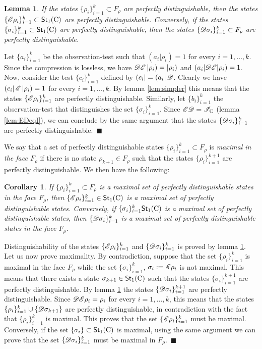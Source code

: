 \documentclass[12pt,aps,pra,showpacs,groupedaddress]{revtex4-1}
\newtheorem{lemma}{Lemma} \newtheorem{proposition}{Proposition}
\newtheorem{corollary}{Corollary} \newtheorem{theorem}{Theorem}
\def\Proof{\medskip\par\noindent{\bf Proof. }}
\def\qed{$\,\blacksquare$\par}
\def\rC{{\rm C}}
\def\Stset{{\mathsf{St}}}
\def\K#1{\left|#1\right)}  \def\B#1{\left(#1\right|}
\begin{document}
\begin{lemma}
  If the states $\{\rho_i\}_{i=1}^k\subset F_\rho$ are perfectly distinguishable, then the states
  $\{\tE\rho_i\}_{i=1}^k\subset\Stset_1(\rC)$ are perfectly distinguishable.  Conversely, if the
  states $\{\sigma_i\}_{i=1}^k\subset\Stset_1(\rC)$ are perfectly distinguishable, then the
  states $\{\mathscr D\sigma_i\}_{i=1}^k\subset F_\rho$ are perfectly distinguishable.
  \label{lem:distienc}
\end{lemma}

\Proof Let $\{a_i\}_{i=1}^k$ be the observation-test such that $(a_i|\rho_i)=1$ for every $i=1,
\dots, k$.  Since the compression is lossless, we have $\tD\tE\K{\rho_i}=\K{\rho_i}$ and
$(a_i|\mathscr D\mathscr E|\rho_i)=1$.  Now, consider the test $\{ c_i\}_{i=1}^k$ defined by $\B {c_i} = \B{a_i}
\tD$.  Clearly we have $\B {c_i} \tE \K{\rho_i} = 1$ for every $i=1, \dots, k$.  By lemma
\ref{lem:simpler} this means that the states $\{\mathscr E\rho_i\}_{i=1}^k$ are perfectly distinguishable.
Similarly, let $\{b_i\}_{i=1}^k$ the observation-test that distinguishes the set $\{\sigma_i\}_{i=1}^k$. Since
$\tE\tD=\tI_\rC$ (lemma \ref{lem:EDeqI}), we can conclude by the same argument that the states
$\{\mathscr D \sigma_i\}_{i=1}^k$ are perfectly distinguishable. \qed


We say that a set of perfectly distinguishable states $\{\rho_i\}_{i=1}^k \subset F_\rho$ is
\emph{maximal in the face $F_\rho$} if there is no state $\rho_{k+1}\in F_\rho$ such that the states
$\{\rho_i\}_{i=1}^{k+1}$ are perfectly distinguishable.  We then have the following:
  \begin{corollary}
    If $\{\rho_i\}_{i=1}^k \subset F_\rho$ is a maximal set of perfectly distinguishable states in
    the face $F_\rho$, then $\{\tE\rho_i\}_{i=1}^k\in\Stset_1 (\rC)$ is a maximal set of perfectly
    distinguishable states. Conversely, if $\{\sigma_i\}_{i=1}^k \Stset_1 (\rC)$ is a maximal set of
    perfectly distinguishable states, then $\{\mathscr D\sigma_i\}_{i=1}^k$ is a maximal set of perfectly
    distinguishable states in the face $F_\rho$.
  \label{cor:maxienc}
\end{corollary}
\Proof Distinguishability of the states $\{\mathscr E \rho_i\}_{i=1}^k$ and $\{\mathscr D\sigma_i\}_{i=1}^k$ is
proved by lemma \ref{lem:distienc}.  Let us now prove maximality.  By contradiction, suppose that the set $\{\rho_i\}_{i=1}^k$ is maximal in the face $F_\rho$ while the set $\{\sigma_i\}_{i=1}^k$, $\sigma_i: =\mathscr E \rho_i$ is not maximal.  This means that there exists a  state $\sigma_{k+1} \in\Stset_1 (\rC)$ such that the states $\{\sigma_i\}_{i=1}^{k+1}$ are perfectly distinguishable.   By lemma \ref{lem:distienc} the states  $\{\mathscr D  \sigma_i\}_{i=1}^{k+1}$ are perfectly distinguishable. Since $\mathscr D \mathscr E  \rho_i  =  \rho_i$ for every $i=1, \dots, k$, this means that the states $\{\rho_i\}_{i=1}^k \cup  \{ \mathscr D \sigma_{k+1} \}$ are perfectly distinguishable, in contradiction with the fact that $\{\rho_i\}_{i=1}^k$ is maximal.  This proves that the set $\{\mathscr E \rho_i\}_{i =1}^k$  must be maximal.   Conversely, if the set $\{\sigma_i\}  \subset \Stset_1 (\rC)$ is maximal, using the same argument we can prove that the set $\{\mathscr D  \sigma_i\}_{i =1}^k$ must be maximal in $ F_\rho$.      \qed
\end{document}
